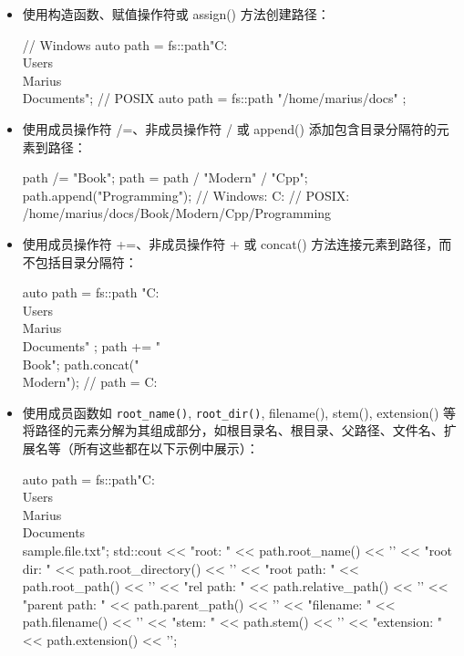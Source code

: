 \begin{itemize}
\item
使用构造函数、赋值操作符或 assign() 方法创建路径：

\begin{cpp}
// Windows
auto path = fs::path{"C:\\Users\\Marius\\Documents"};
// POSIX
auto path = fs::path{ "/home/marius/docs" };
\end{cpp}

\item
使用成员操作符 /=、非成员操作符 / 或 append() 添加包含目录分隔符的元素到路径：

\begin{cpp}
path /= "Book";
path = path / "Modern" / "Cpp";
path.append("Programming");
// Windows: C:\Users\Marius\Documents\Book\Modern\Cpp\Programming
// POSIX:   /home/marius/docs/Book/Modern/Cpp/Programming
\end{cpp}

\item
使用成员操作符 +=、非成员操作符 + 或 concat() 方法连接元素到路径，而不包括目录分隔符：

\begin{cpp}
auto path = fs::path{ "C:\\Users\\Marius\\Documents" };
path += "\\Book";
path.concat("\\Modern");
// path = C:\Users\Marius\Documents\Book\Modern
\end{cpp}

\item
使用成员函数如 \verb|root_name()|, \verb|root_dir()|, filename(), stem(), extension() 等将路径的元素分解为其组成部分，如根目录名、根目录、父路径、文件名、扩展名等（所有这些都在以下示例中展示）：

\begin{cpp}
auto path =
    fs::path{"C:\\Users\\Marius\\Documents\\sample.file.txt"};
std::cout
    << "root: "        << path.root_name() << '\n'
    << "root dir: "    << path.root_directory() << '\n'
    << "root path: "   << path.root_path() << '\n'
    << "rel path: "    << path.relative_path() << '\n'
    << "parent path: " << path.parent_path() << '\n'
    << "filename: "    << path.filename() << '\n'
    << "stem: "        << path.stem() << '\n'
    << "extension: "   << path.extension() << '\n';
\end{cpp}


\end{itemize}
